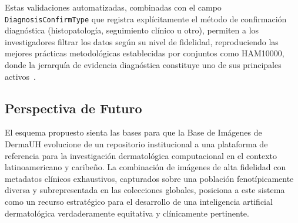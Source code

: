 Estas validaciones automatizadas, combinadas con el campo \texttt{DiagnosisConfirmType} que registra explícitamente el método de confirmación diagnóstica (histopatología, seguimiento clínico u otro), permiten a los investigadores filtrar los datos según su nivel de fidelidad, reproduciendo las mejores prácticas metodológicas establecidas por conjuntos como HAM10000, donde la jerarquía de evidencia diagnóstica constituye uno de sus principales activos~\cite{pmc_ham10000}.

\subsection{Perspectiva de Futuro}

El esquema propuesto sienta las bases para que la Base de Imágenes de DermaUH evolucione de un repositorio institucional a una plataforma de referencia para la investigación dermatológica computacional en el contexto latinoamericano y caribeño. La combinación de imágenes de alta fidelidad con metadatos clínicos exhaustivos, capturados sobre una población fenotípicamente diversa y subrepresentada en las colecciones globales, posiciona a este sistema como un recurso estratégico para el desarrollo de una inteligencia artificial dermatológica verdaderamente equitativa y clínicamente pertinente.